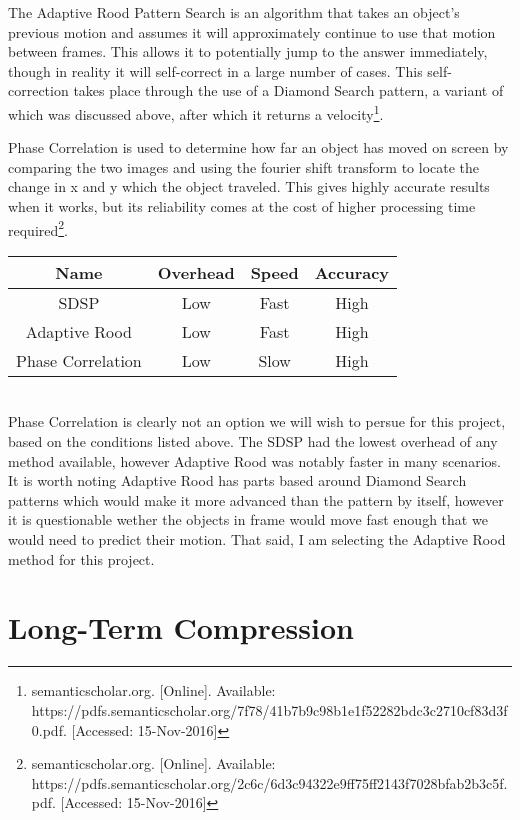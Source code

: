 \documentclass[letterpaper,10pt,onecolumn,draftclsnofoot]{IEEEtran}
\begin{document}
The Adaptive Rood Pattern Search is an algorithm that takes an object's previous motion and assumes it will approximately continue to use that motion between frames.  This allows it to potentially jump to the answer immediately, though in reality it will self-correct in a large number of cases.  This self-correction takes place through the use of a Diamond Search pattern, a variant of which was discussed above, after which it returns a velocity\footnote{semanticscholar.org. [Online]. Available: https://pdfs.semanticscholar.org/7f78/41b7b9c98b1e1f52282bdc3c2710cf83d3f0.pdf. [Accessed: 15-Nov-2016] }.

Phase Correlation is used to determine how far an object has moved on screen by comparing the two images and using the fourier shift transform to locate the change in x and y which the object traveled.  This gives highly accurate results when it works, but its reliability  comes at the cost of higher processing time required\footnote{semanticscholar.org. [Online]. Available: https://pdfs.semanticscholar.org/2c6c/6d3c94322e9ff75ff2143f7028bfab2b3c5f.pdf. [Accessed: 15-Nov-2016] }. \\

\begin{tabular}{|c|c|c|c|}
  \hline
  \textbf{Name} & \textbf{Overhead} & \textbf{Speed} & \textbf{Accuracy} \\
  \hline
  SDSP & Low & Fast & High \\ 
  \hline
  Adaptive Rood & Low & Fast & High  \\ 
  \hline
  Phase Correlation & Low & Slow & High \\ 
  \hline
\end{tabular} \\

Phase Correlation is clearly not an option we will wish to persue for this project, based on the conditions listed above.  The SDSP had the lowest overhead of any method available, however Adaptive Rood was notably faster in many scenarios.  It is worth noting Adaptive Rood has parts based around Diamond Search patterns which would make it more advanced than the pattern by itself, however it is questionable wether the objects in frame would move fast enough that we would need to predict their motion.  That said, I am selecting the Adaptive Rood method for this project.


\section{Long-Term Compression} %
\end{document}
